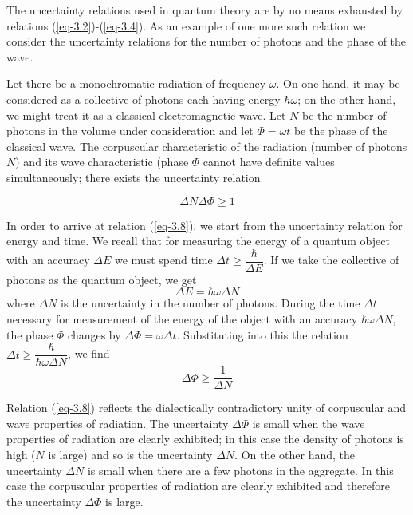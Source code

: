 \documentclass[a4paper,sfsidenotes,colorlinks=true]{tufte-book}
\numberwithin{equation}{section}
\numberwithin{figure}{section}
\begin{document}
The 
uncertainty relations used in quantum theory are by no means exhausted
by relations (\ref{eq-3.2})-(\ref{eq-3.4}). As an example of one more
such relation we consider the uncertainty relations for the number
of photons and the phase of the wave.

Let there be a monochromatic radiation of frequency $\omega$. On one hand,
it may be considered as a collective of photons each having energy
$\hbar \omega$; on the other hand, we might treat it as a classical
electromagnetic wave. Let $N$ be the number of photons in the volume
under consideration and let $\Phi = \omega t$ be the phase of the classical
wave. The corpuscular characteristic of the radiation (number of
photons $N$) and its wave characteristic (phase $\Phi$ cannot have definite
values simultaneously; there exists the uncertainty relation 
\addtocounter{equation}{2}
\begin{equation}%
\Delta N \Delta \Phi \ge 1 
\label{eq-3.8} 
\end{equation}

In order to arrive at relation (\ref{eq-3.8}), we start from the
uncertainty relation for energy and time. We recall that for measuring
the energy of a quantum object with an accuracy $\Delta E$ we must
spend time $\Delta t \ge \dfrac{\hbar}{\Delta E}$. If we take the
collective of photons as the quantum object, we get
\begin{equation*}%
\Delta E = \hbar \omega \Delta N  
\end{equation*}
where $\Delta N$ is the uncertainty in the number of photons. During
the time $\Delta t$ necessary for measurement of the energy of the
object with an accuracy $\hbar \omega \Delta N$, the phase $\Phi$
changes by $\Delta \Phi = \omega \Delta t$. Substituting into this the
relation $\Delta t \ge \dfrac{\hbar}{\hbar \omega \Delta N}$, we
find
\begin{equation*}%
\Delta \Phi \ge \frac{1}{\Delta N}  
\end{equation*}

Relation (\ref{eq-3.8}) reflects the dialectically contradictory unity
of corpuscular and wave properties of radiation. The uncertainty
$\Delta \Phi$ is small when the wave properties of radiation are
clearly exhibited; in this case the density of photons is high ($N$ is
large) and so is the uncertainty $\Delta N$. On the other hand, the
uncertainty $\Delta N$ is small when there are a few photons in the
aggregate. In this case the corpuscular properties of radiation are
clearly exhibited and therefore the uncertainty $\Delta \Phi$ is large.
\end{document}
